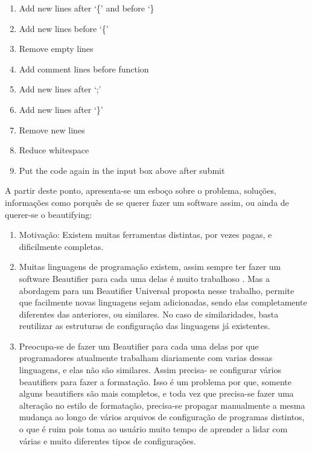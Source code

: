 \begin{englishtext}
    \medskip
    \begin{bluebox}
    \begin{enumerate}[nolistsep]
        \item Add new lines after `\{' and before `\}
        \item Add new lines before `\{'
        \item Remove empty lines
        \item Add comment lines before function
        \item Add new lines after `;'
        \item Add new lines after `\}'
        \item Remove new lines
        \item Reduce whitespace
        \item Put the code again in the input box above after submit
    \end{enumerate}
    \end{bluebox}

    A partir deste ponto, apresenta-se um esboço sobre o problema, soluções, informações como
    porquês de se querer fazer um software assim, ou ainda de querer-se o beautifying:

    \begin{enumerate}[leftmargin=*]

        \item

        Motivação: Existem muitas ferramentas distintas, por vezes pagas, e
        dificilmente completas. \cite{universalCodeFormatter}

        \item

        Muitas linguagens de programação existem, assim sempre ter fazer um software Beautifier para
        cada uma delas é muito trabalhoso \cite{universalCodeFormatter}. Mas a abordagem para um Beautifier
        Universal proposta nesse trabalho, permite que facilmente novas linguagens sejam
        adicionadas, sendo elas completamente diferentes das anteriores, ou similares. No caso de
        similaridades, basta reutilizar as estruturas de configuração das linguagens já existentes.

        \item

        Preocupa-se de fazer um Beautifier para cada uma delas por que programadores atualmente
        trabalham diariamente com varias dessas linguagens, e elas não são similares. Assim precisa-
        se configurar vários beautifiers para fazer a formatação. Isso é um problema por que,
        somente alguns beautifiers são mais completos, e toda vez que precisa-se fazer uma alteração
        no estilo de formatação, precisa-se propagar manualmente a mesma mudança ao longo de vários
        arquivos de configuração de programas distintos, o que é ruim pois toma ao usuário muito
        tempo de aprender a lidar com várias e muito diferentes tipos de configurações.
        \cite{Schweitzer}


\end{enumerate}
\end{englishtext}
